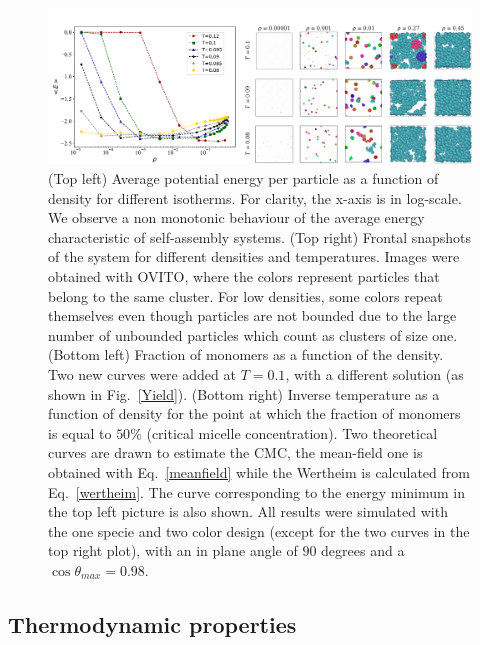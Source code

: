 \documentclass[a4paper, amsfonts, amssymb, amsmath, reprint, showkeys, nofootinbib, twoside]{revtex4-1}
\begin{document}
\begin{figure}[t]
	\includegraphics{fig5.pdf}
	\caption{\label{Energy} (Top left) Average potential energy per particle as a function of density for different isotherms. For clarity, the x-axis is in log-scale. We observe a non monotonic behaviour of the average energy characteristic of self-assembly systems. (Top right) Frontal snapshots of the system for different densities and temperatures. Images were obtained with OVITO, where the colors represent particles that belong to the same cluster. For low densities, some colors repeat themselves even though particles are not bounded due to the large number of unbounded particles which count as clusters of size one. (Bottom left) Fraction of monomers as a function of the density. Two new curves were added at $T=0.1$, with a different solution (as shown in Fig.~\ref{Yield}). (Bottom right) Inverse temperature as a function of density for the point at which the fraction of monomers is equal to $50\%$ (critical micelle concentration). Two theoretical curves are drawn to estimate the CMC, the mean-field one is obtained with Eq.~\eqref{meanfield} while the Wertheim is calculated from Eq.~\eqref{wertheim}. The curve corresponding to the energy minimum in the top left picture is also shown. All results were simulated with the one specie and two color design (except for the two curves in the top right plot), with an in plane angle of $90$ degrees and a $\cos\theta_{max}=0.98$.}
\end{figure}

\subsection{Thermodynamic properties}
\end{document}
